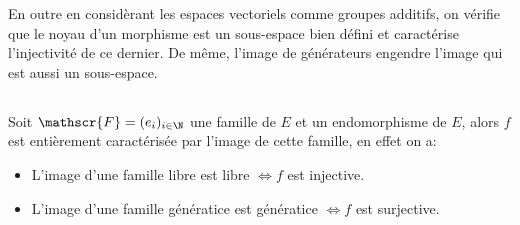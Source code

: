 En outre en considèrant les espaces vectoriels comme groupes additifs, on vérifie que le noyau d'un morphisme est un sous-espace bien défini et caractérise l'injectivité de ce dernier. De même, l'image de générateurs engendre l'image qui est aussi un sous-espace.
\subsection*{}

Soit \(\mathscr{F} = (e_i)_{i \in \N}\) une famille de \(E\) et un endomorphisme de \(E\), alors \(f\) est entièrement caractérisée par l'image de cette famille, en effet on a:
\begin{itemize}
   \item L'image d'une famille libre est libre \(\Longleftrightarrow f\) est injective.
   \item L'image d'une famille génératice est génératice \(\Longleftrightarrow f\) est surjective.      
\end{itemize}
